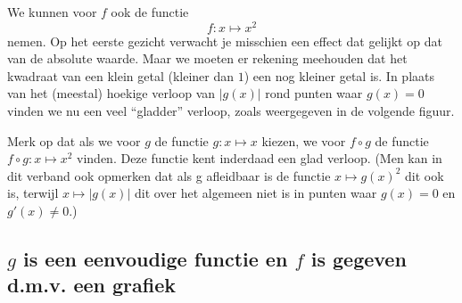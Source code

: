 \newpage

We kunnen voor $f$ ook de functie
\[
f:x\mapsto x^2
\]
nemen. Op het eerste gezicht verwacht je misschien een effect dat
gelijkt op dat van de absolute waarde. Maar we moeten er rekening
meehouden dat het kwadraat van een klein getal (kleiner dan $1$) een
nog kleiner getal is.  In plaats van het (meestal) hoekige verloop van
$|g(x)|$ rond punten waar $g(x)=0$ vinden we nu een veel ``gladder''
verloop, zoals weergegeven in de volgende figuur.

\begin{center}
\end{center}


Merk op dat als we voor $g$ de functie $g:x\mapsto x$ kiezen, we voor
$f\circ g$ de functie $f\circ g:x\mapsto x^2$ vinden. Deze functie
kent inderdaad een glad verloop. (Men kan in dit verband ook opmerken
dat als g afleidbaar is de functie $x\mapsto g(x)^2$ dit ook is, terwijl
$x\mapsto |g(x)|$ dit over het algemeen niet is in punten waar $g(x)=0$ en
$g'(x)\neq 0$.)

\subsection{$g$ is een eenvoudige functie en $f$ is gegeven d.m.v. een grafiek}

